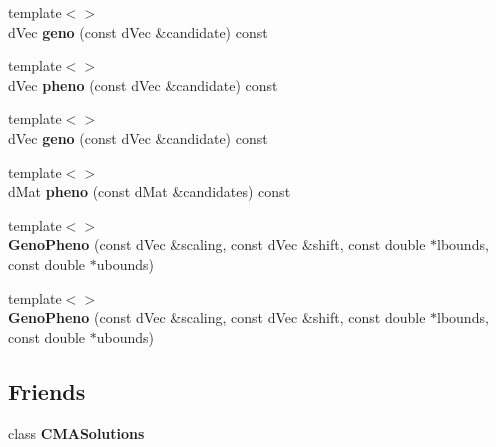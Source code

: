 \begin{DoxyCompactItemize}
\item 
\hypertarget{classlibcmaes_1_1GenoPheno_a5179951748808e74319482bc18c06af9}{{\footnotesize template$<$$>$ }\\d\+Vec {\bfseries geno} (const d\+Vec \&candidate) const}\label{classlibcmaes_1_1GenoPheno_a5179951748808e74319482bc18c06af9}

\item 
\hypertarget{classlibcmaes_1_1GenoPheno_acbd977770e9b0395a14951c5e05c4949}{{\footnotesize template$<$$>$ }\\d\+Vec {\bfseries pheno} (const d\+Vec \&candidate) const}\label{classlibcmaes_1_1GenoPheno_acbd977770e9b0395a14951c5e05c4949}

\item 
\hypertarget{classlibcmaes_1_1GenoPheno_a58481a077a9b020b5b932668c94b41d3}{{\footnotesize template$<$$>$ }\\d\+Vec {\bfseries geno} (const d\+Vec \&candidate) const}\label{classlibcmaes_1_1GenoPheno_a58481a077a9b020b5b932668c94b41d3}

\item 
\hypertarget{classlibcmaes_1_1GenoPheno_a7bea30d3dcae75600b5f30c616c55ef2}{{\footnotesize template$<$$>$ }\\d\+Mat {\bfseries pheno} (const d\+Mat \&candidates) const}\label{classlibcmaes_1_1GenoPheno_a7bea30d3dcae75600b5f30c616c55ef2}

\item 
\hypertarget{classlibcmaes_1_1GenoPheno_adbe3631f81843ff59d935fe7551a954f}{{\footnotesize template$<$$>$ }\\{\bfseries Geno\+Pheno} (const d\+Vec \&scaling, const d\+Vec \&shift, const double $\ast$lbounds, const double $\ast$ubounds)}\label{classlibcmaes_1_1GenoPheno_adbe3631f81843ff59d935fe7551a954f}

\item 
\hypertarget{classlibcmaes_1_1GenoPheno_a290b5770f19f5fe1f70cb60280c8a5b3}{{\footnotesize template$<$$>$ }\\{\bfseries Geno\+Pheno} (const d\+Vec \&scaling, const d\+Vec \&shift, const double $\ast$lbounds, const double $\ast$ubounds)}\label{classlibcmaes_1_1GenoPheno_a290b5770f19f5fe1f70cb60280c8a5b3}

\end{DoxyCompactItemize}
\subsection*{Friends}
\begin{DoxyCompactItemize}
\item 
\hypertarget{classlibcmaes_1_1GenoPheno_a78b1b9910ebce544de9b54b998e77879}{class {\bfseries C\+M\+A\+Solutions}}\label{classlibcmaes_1_1GenoPheno_a78b1b9910ebce544de9b54b998e77879}

\end{DoxyCompactItemize}


